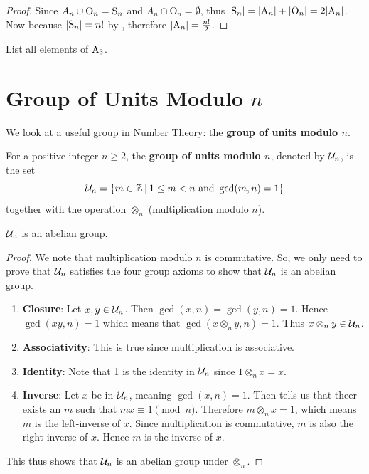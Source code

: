 \begin{proof}
    Since $A_n \cup \mathrm{O}_n = \mathrm{S}_{n}$ and $A_n \cap \mathrm{O}_n = \emptyset$, thus $|\mathrm{S}_{n}| = |\mathrm{A}_{n}| + |\mathrm{O}_n| = 2|\mathrm{A}_{n}|$. Now because $|\mathrm{S}_{n}| = n!$ by , therefore $|\mathrm{A}_{n}| = \frac{n!}2$.
\end{proof}

\begin{exercise}
    List all elements of $\mathrm{A}_{3}$.
\end{exercise}

\section{Group of Units Modulo \texorpdfstring{$n$}{n}}
We look at a useful group in Number Theory: the \textbf{group of units modulo $n$}.

\begin{definition}
    For a positive integer $n \geq 2$, the \textbf{group of units modulo $n$}, denoted by $\mathcal{U}_{n}$, is the set
    \[
        \Un{n} = \{m \in \mathbb{Z} \vert 1 \leq m < n \text{ and } \gcd(m, n) = 1\}
    \]
    together with the operation $\otimes_n$ (multiplication modulo $n$).
\end{definition}

\begin{proposition}
    $\mathcal{U}_{n}$ is an abelian group.
\end{proposition}
\begin{proof}
    We note that multiplication modulo $n$ is commutative. So, we only need to prove that $\mathcal{U}_{n}$ satisfies the four group axioms to show that $\mathcal{U}_{n}$ is an abelian group.
    \begin{enumerate}
        \item \textbf{Closure}: Let $x, y \in \mathcal{U}_{n}$. Then $\gcd(x, n) = \gcd(y, n) = 1$. Hence $\gcd(xy, n) = 1$ which means that $\gcd(x\otimes_ny,n)=1$. Thus $x\otimes_ny \in \mathcal{U}_{n}$.
        
        \item \textbf{Associativity}: This is true since multiplication is associative.
        
        \item \textbf{Identity}: Note that 1 is the identity in $\mathcal{U}_{n}$ since $1 \otimes_n x = x$.
        
        \item \textbf{Inverse}: Let $x$ be in $\mathcal{U}_{n}$, meaning $\gcd(x, n) = 1$. Then  tells us that theer exists an $m$ such that $mx \equiv 1 \pmod n$. Therefore $m \otimes_n x = 1$, which means $m$ is the left-inverse of $x$. Since multiplication is commutative, $m$ is also the right-inverse of $x$. Hence $m$ is the inverse of $x$.
    \end{enumerate}
    This thus shows that $\mathcal{U}_{n}$ is an abelian group under $\otimes_n$.
\end{proof}

